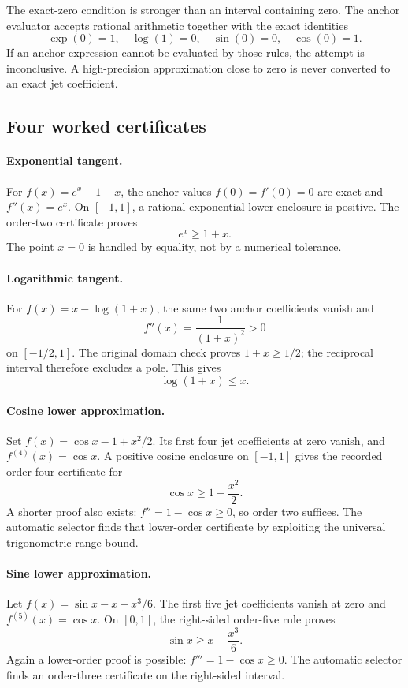 The exact-zero condition is stronger than an interval containing zero. The anchor evaluator accepts rational arithmetic together with the exact identities
\[
 \exp(0)=1,\quad\log(1)=0,\quad\sin(0)=0,\quad\cos(0)=1.
\]
If an anchor expression cannot be evaluated by those rules, the attempt is inconclusive. A high-precision approximation close to zero is never converted to an exact jet coefficient.

\subsection{Four worked certificates}

\paragraph{Exponential tangent.}
For \(f(x)=e^x-1-x\), the anchor values \(f(0)=f'(0)=0\) are exact and \(f''(x)=e^x\). On \([-1,1]\), a rational exponential lower enclosure is positive. The order-two certificate proves
\[
 e^x\ge1+x.
\]
The point \(x=0\) is handled by equality, not by a numerical tolerance.

\paragraph{Logarithmic tangent.}
For \(f(x)=x-\log(1+x)\), the same two anchor coefficients vanish and
\[
 f''(x)=\frac{1}{(1+x)^2}>0
\]
on \([-1/2,1]\). The original domain check proves \(1+x\ge1/2\); the reciprocal interval therefore excludes a pole. This gives
\[
 \log(1+x)\le x.
\]

\paragraph{Cosine lower approximation.}
Set \(f(x)=\cos x-1+x^2/2\). Its first four jet coefficients at zero vanish, and \(f^{(4)}(x)=\cos x\). A positive cosine enclosure on \([-1,1]\) gives the recorded order-four certificate for
\[
 \cos x\ge1-\frac{x^2}{2}.
\]
A shorter proof also exists: \(f''=1-\cos x\ge0\), so order two suffices. The automatic selector finds that lower-order certificate by exploiting the universal trigonometric range bound.

\paragraph{Sine lower approximation.}
Let \(f(x)=\sin x-x+x^3/6\). The first five jet coefficients vanish at zero and \(f^{(5)}(x)=\cos x\). On \([0,1]\), the right-sided order-five rule proves
\[
 \sin x\ge x-\frac{x^3}{6}.
\]
Again a lower-order proof is possible: \(f'''=1-\cos x\ge0\). The automatic selector finds an order-three certificate on the right-sided interval.

